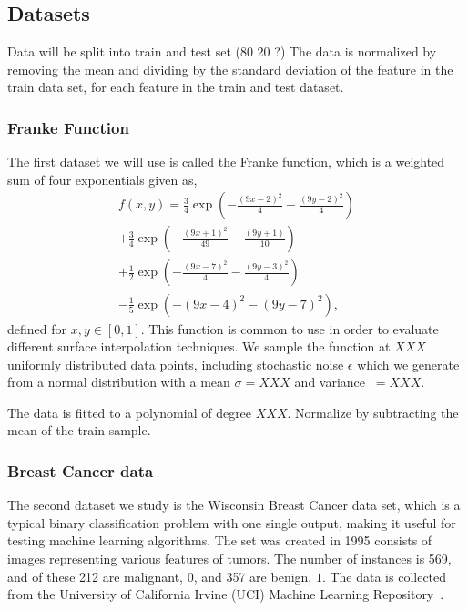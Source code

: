 \documentclass[english,notitlepage,reprint,nofootinbib]{revtex4–2}  %
\begin{document}
\subsection*{Datasets}
Data will be split into train and test set (80 20 ?) 
The data is normalized by removing the mean and dividing by the standard deviation of the feature in the train data set, for each feature in the train and test dataset. 

\subsubsection{Franke Function}
The first dataset we will use is called the Franke function, which is a weighted sum of four exponentials given as, 
\begin{align}\label{eq: frankie}
    f(x,y) = \frac{3}{4} \exp\left(
             -\frac{{\left( 9x-2\right)}^2}{4}
             -\frac{{\left( 9y-2\right)}^2}{4}
             \right) 
             \\ 
            +\frac{3}{4} \exp\left(
             -\frac{{\left( 9x+1\right)}^2}{49}
             -\frac{{\left( 9y+1\right)}}{10}
             \right) \nonumber
             \\ 
            +\frac{1}{2} \exp\left(
             -\frac{{\left( 9x-7\right)}^2}{4}
             -\frac{{\left( 9y-3\right)}^2}{4}
             \right) \nonumber
             \\ 
            -\frac{1}{5} \exp\left(
            -{\left(9x-4\right)}^2 - {\left(9y-7\right)}^2
             \right), \nonumber
\end{align}
defined for $x,y\in [0,1]$. 
This function is common to use in order to evaluate different surface interpolation techniques. 
We sample the function at $XXX$ uniformly distributed data points, including stochastic noise $\epsilon$ which we generate from a normal distribution with a mean $\sigma = XXX$ and variance $\ = XXX$. 

The data is fitted to a polynomial of degree $XXX$. 
Normalize by subtracting the mean of the train sample. 


\subsubsection{Breast Cancer data}
The second dataset we study is the Wisconsin Breast Cancer data set, which is a typical binary classification problem with one single output, making it useful for testing machine learning algorithms. The set was created in 1995 consists of images representing various features of tumors. The number of instances is 569, and of these 212 are malignant, $0$, and 357 are benign, $1$. The data is collected from the University of California Irvine (UCI) Machine Learning Repository~\cite{BreastCancerData}. 
\end{document}
